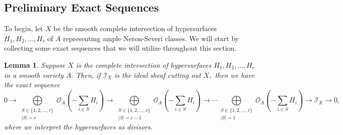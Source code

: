 \documentclass{article}
\newtheorem{lemma}[thm]{Lemma}
\theoremstyle{definition}
\theoremstyle{remark}
\begin{document}
\subsection{Preliminary Exact Sequences}
\par To begin, let $X$ be the smooth complete intersection of hypersurfaces $H_1, H_2, \ldots, H_r$ of $A$ representing ample Neron-Severi classes. We will start by collecting some exact sequences that we will utilize throughout this section.
\begin{lemma}\label{lem: global Koszul}
Suppose $X$ is the complete intersection of hypersurfaces $H_1, H_2, \dots, H_r$ in a smooth variety $A.$ Then, if $\mathcal{I}_X$ is the ideal sheaf cutting out $X,$ then we have the exact sequence \[0 \rightarrow \bigoplus\limits_{\substack{S \in \{1, 2, \ldots, r\}\\|S| = r}} \mathcal{O}_A(-\sum\limits_{i \in S} H_i) \rightarrow \bigoplus\limits_{\substack{S \in \{1, 2, \ldots, r\}\\|S| = r-1}} \mathcal{O}_A(-\sum\limits_{i \in S} H_i) \rightarrow \cdots \bigoplus\limits_{\substack{S \in \{1, 2, \ldots, r\}\\|S| = 1}} \mathcal{O}_A(-\sum\limits_{i \in S} H_i) \rightarrow \mathcal{I}_X \rightarrow 0,\] where we interpret the hypersurfaces as divisors.
\end{lemma}
\end{document}
